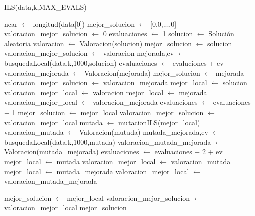 \documentclass[12pt,a4paper]{article}
\begin{document}
	\begin{algorithm}
		\caption{ILS(data,k,MAX\_EVALS)}
		\begin{algorithmic}			
			\STATE ncar $\leftarrow$ longitud(data[0])
			\STATE mejor\_solucion $\leftarrow$ [0,0,...,0]
			\STATE valoracion\_mejor\_solucion $\leftarrow$ 0
			\STATE evaluaciones $\leftarrow$ 1
				\STATE solucion $\leftarrow$ Solución aleatoria
				\STATE valoracion $\leftarrow$ Valoracion(solucion)
					\STATE mejor\_solucion $\leftarrow$ solucion
					\STATE valoracion\_mejor\_solucion $\leftarrow$ valoracion
				\ENDIF
				\STATE mejorada,ev $\leftarrow$ busquedaLocal(data,k,1000,solucion)
				\STATE evaluaciones $\leftarrow$ evaluciones + ev
				\STATE valoracion\_mejorada $\leftarrow$ Valoracion(mejorada)
					\STATE mejor\_solucion $\leftarrow$ mejorada
					\STATE valoracion\_mejor\_solucion $\leftarrow$ valoracion\_mejorada
				\ENDIF
					\STATE mejor\_local $\leftarrow$ solucion
					\STATE valoracion\_mejor\_local $\leftarrow$ valoracion
				\ELSE
					\STATE mejor\_local $\leftarrow$ mejorada
					\STATE valoracion\_mejor\_local $\leftarrow$ valoracion\_mejorada
				\ENDIF
				\STATE evaluaciones $\leftarrow$ evaluaciones + 1
					\STATE mejor\_solucion $\leftarrow$ mejor\_local
					\STATE valoracion\_mejor\_solucion $\leftarrow$ valoracion\_mejor\_local
				\ENDIF
					\STATE mutada $\leftarrow$ mutacionILS(mejor\_local)
					\STATE valoracion\_mutada $\leftarrow$ Valoracion(mutada)
					\STATE mutada\_mejorada,ev $\leftarrow$ busquedaLocal(data,k,1000,mutada)
					\STATE valoracion\_mutada\_mejorada $\leftarrow$ Valoracion(mutada\_mejorada)
					\STATE evaluaciones $\leftarrow$ evaluaciones + 2 + ev
						\STATE mejor\_local $\leftarrow$ mutada
						\STATE valoracion\_mejor\_local $\leftarrow$ valoracion\_mutada
					\ELSE
						\STATE mejor\_local $\leftarrow$ mutada\_mejorada
						\STATE valoracion\_mejor\_local $\leftarrow$ valoracion\_mutada\_mejorada
					\ENDIF
					
						\STATE mejor\_solucion $\leftarrow$ mejor\_local
						\STATE valoracion\_mejor\_solucion $\leftarrow$ valoracion\_mejor\_local
					\ENDIF
				\ENDFOR
			\ENDWHILE
			\RETURN mejor\_solucion
			
		\end{algorithmic}
	\end{algorithm}
	
\end{document}
